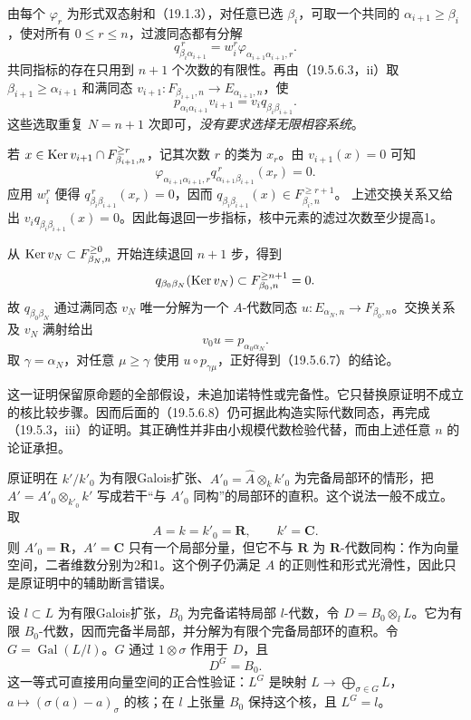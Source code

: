 由每个 $\varphi_r$ 为形式双态射和（19.1.3），对任意已选 $\beta_i$，可取一个共同的 $\alpha_{i+1}\geq\beta_i$，使对所有 $0\leq r\leq n$，过渡同态都有分解
\[
 q_{\beta_i\alpha_{i+1}}^{\,r}
 =w_i^r\varphi_{\alpha_{i+1}\alpha_{i+1},r}.
\]
共同指标的存在只用到 $n+1$ 个次数的有限性。再由（19.5.6.3，ii）取
$\beta_{i+1}\geq\alpha_{i+1}$ 和满同态
$v_{i+1}:F_{\beta_{i+1},n}\to E_{\alpha_{i+1},n}$，使
\[
 p_{\alpha_i\alpha_{i+1}}v_{i+1}
   =v_iq_{\beta_i\beta_{i+1}}.
\]
这些选取重复 $N=n+1$ 次即可，\emph{没有要求选择无限相容系统}。

若 $x\in\operatorname{Ker} v_{i+1}\cap F_{\beta_{i+1},n}^{\geq r}$，记其次数 $r$ 的类为 $x_r$。由 $v_{i+1}(x)=0$ 可知
\[
 \varphi_{\alpha_{i+1}\alpha_{i+1},r}
       q_{\alpha_{i+1}\beta_{i+1}}^{\,r}(x_r)=0.
\]
应用 $w_i^r$ 便得
$q_{\beta_i\beta_{i+1}}^{\,r}(x_r)=0$，因而
$q_{\beta_i\beta_{i+1}}(x)\in F_{\beta_i,n}^{\geq r+1}$。
上述交换关系又给出
$v_iq_{\beta_i\beta_{i+1}}(x)=0$。因此每退回一步指标，核中元素的滤过次数至少提高1。

从 $\operatorname{Ker} v_N\subset F_{\beta_N,n}^{\geq0}$ 开始连续退回 $n+1$ 步，得到
\[
 q_{\beta_0\beta_N}(\operatorname{Ker} v_N)
       \subset F_{\beta_0,n}^{\geq n+1}=0.
\]
故 $q_{\beta_0\beta_N}$ 通过满同态 $v_N$ 唯一分解为一个 $A$-代数同态
$u:E_{\alpha_N,n}\to F_{\beta_0,n}$。交换关系及 $v_N$ 满射给出
\[
 v_0u=p_{\alpha_0\alpha_N}.
\]
取 $\gamma=\alpha_N$，对任意 $\mu\geq\gamma$ 使用 $u\circ p_{\gamma\mu}$，正好得到（19.5.6.7）的结论。

这一证明保留原命题的全部假设，未追加诺特性或完备性。它只替换原证明不成立的核比较步骤。因而后面的（19.5.6.8）仍可据此构造实际代数同态，再完成（19.5.3，iii）的证明。其正确性并非由小规模代数检验代替，而由上述任意 $n$ 的论证承担。

原证明在 $k'/k'_0$ 为有限Galois扩张、$A'_0=\widehat A\otimes_k k'_0$ 为完备局部环的情形，把 $A'=A'_0\otimes_{k'_0}k'$ 写成若干“与 $A'_0$ 同构”的局部环的直积。这个说法一般不成立。取
\[
 A=k=k'_0=\mathbf R,\qquad k'=\mathbf C.
\]
则 $A'_0=\mathbf R$，$A'=\mathbf C$ 只有一个局部分量，但它不与 $\mathbf R$ 为 $\mathbf R$-代数同构：作为向量空间，二者维数分别为2和1。这个例子仍满足 $A$ 的正则性和形式光滑性，因此只是原证明中的辅助断言错误。

设 $l\subset L$ 为有限Galois扩张，$B_0$ 为完备诺特局部 $l$-代数，令
$D=B_0\otimes_l L$。它为有限 $B_0$-代数，因而完备半局部，并分解为有限个完备局部环的直积。令 $G=\operatorname{Gal}(L/l)$。$G$ 通过 $1\otimes\sigma$ 作用于 $D$，且
\[
 D^G=B_0.
\]
这一等式可直接用向量空间的正合性验证：$L^G$ 是映射
$L\to\bigoplus_{\sigma\in G}L$，$a\mapsto(\sigma(a)-a)_\sigma$ 的核；在 $l$ 上张量 $B_0$ 保持这个核，且 $L^G=l$。

